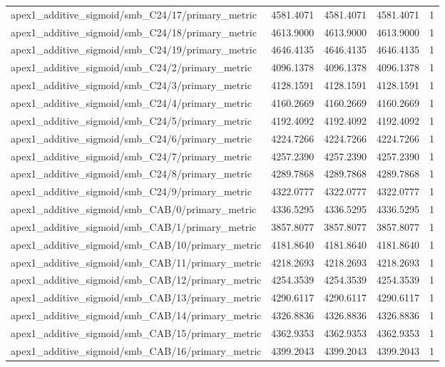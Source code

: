 \begin{table}[h]
\begin{tabular}{lrrrr}
apex1_additive_sigmoid/smb_C24/17/primary_metric & 4581.4071 & 4581.4071 & 4581.4071 & 1 \\
apex1_additive_sigmoid/smb_C24/18/primary_metric & 4613.9000 & 4613.9000 & 4613.9000 & 1 \\
apex1_additive_sigmoid/smb_C24/19/primary_metric & 4646.4135 & 4646.4135 & 4646.4135 & 1 \\
apex1_additive_sigmoid/smb_C24/2/primary_metric & 4096.1378 & 4096.1378 & 4096.1378 & 1 \\
apex1_additive_sigmoid/smb_C24/3/primary_metric & 4128.1591 & 4128.1591 & 4128.1591 & 1 \\
apex1_additive_sigmoid/smb_C24/4/primary_metric & 4160.2669 & 4160.2669 & 4160.2669 & 1 \\
apex1_additive_sigmoid/smb_C24/5/primary_metric & 4192.4092 & 4192.4092 & 4192.4092 & 1 \\
apex1_additive_sigmoid/smb_C24/6/primary_metric & 4224.7266 & 4224.7266 & 4224.7266 & 1 \\
apex1_additive_sigmoid/smb_C24/7/primary_metric & 4257.2390 & 4257.2390 & 4257.2390 & 1 \\
apex1_additive_sigmoid/smb_C24/8/primary_metric & 4289.7868 & 4289.7868 & 4289.7868 & 1 \\
apex1_additive_sigmoid/smb_C24/9/primary_metric & 4322.0777 & 4322.0777 & 4322.0777 & 1 \\
apex1_additive_sigmoid/smb_CAB/0/primary_metric & 4336.5295 & 4336.5295 & 4336.5295 & 1 \\
apex1_additive_sigmoid/smb_CAB/1/primary_metric & 3857.8077 & 3857.8077 & 3857.8077 & 1 \\
apex1_additive_sigmoid/smb_CAB/10/primary_metric & 4181.8640 & 4181.8640 & 4181.8640 & 1 \\
apex1_additive_sigmoid/smb_CAB/11/primary_metric & 4218.2693 & 4218.2693 & 4218.2693 & 1 \\
apex1_additive_sigmoid/smb_CAB/12/primary_metric & 4254.3539 & 4254.3539 & 4254.3539 & 1 \\
apex1_additive_sigmoid/smb_CAB/13/primary_metric & 4290.6117 & 4290.6117 & 4290.6117 & 1 \\
apex1_additive_sigmoid/smb_CAB/14/primary_metric & 4326.8836 & 4326.8836 & 4326.8836 & 1 \\
apex1_additive_sigmoid/smb_CAB/15/primary_metric & 4362.9353 & 4362.9353 & 4362.9353 & 1 \\
apex1_additive_sigmoid/smb_CAB/16/primary_metric & 4399.2043 & 4399.2043 & 4399.2043 & 1 \\

\end{tabular}
\end{table}

